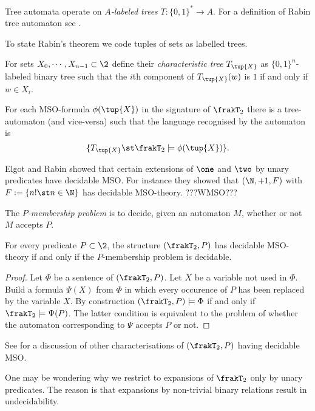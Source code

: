 Tree automata operate on {\em $A$-labeled trees} $T:\{0,1\}^\ast \to A$. 
For a definition of Rabin tree automaton see \cite{}.

To state Rabin's theorem we code tuples of sets as labelled trees.

\begin{definition}
For sets $X_0, \cdots,  X_{n-1} \subset \2$ define their {\em characteristic
tree} $T_{\tup{X}}$ as $\{0,1\}^n$-labeled binary tree such that the $i$th
component of $T_{\tup{X}}(w)$ is $1$ if and only if $w \in X_i$.
\end{definition}

\begin{theorem}
For each MSO-formula $\phi(\tup{X})$ in the signature of $\frakT_2$ there is a tree-automaton (and vice-versa) such that the language recognised by the automaton is
\[
\{T_{\tup{X}} \st \frakT_2 \models \phi(\tup{X})\}.
\]
\end{theorem}

Elgot and Rabin showed that certain extensions of $\one$ and $\two$ by unary
predicates have decidable MSO.  For instance they showed that $(\N,+1,F)$
with $F := \{n! \st n \in \N\}$ has decidable MSO-theory. ???WMSO???
 
The {\em $P$-membership problem} is to decide, given an automaton $M$,
whether or not $M$ accepts $P$.

\begin{lemma}
For every predicate $P \subset \2$, the structure $(\frakT_2,P)$ has decidable
MSO-theory if and only if the $P$-membership problem is decidable.
\end{lemma}

\begin{proof}
Let $\Phi$ be a sentence of $(\frakT_2,P)$. Let $X$ be a
variable not used in $\Phi$.  Build a formula $\Psi(X)$ from $\Phi$ in which
every occurence of $P$ has been replaced by the variable $X$.  By construction
$(\frakT_2,P) \models \Phi$ if and only if $\frakT_2 \models \Psi(P)$.  The
latter condition is equivalent to the problem of whether the automaton
corresponding to $\Psi$ accepts $P$ or not.
\end{proof}

See \cite{} for a discussion of other characterisations of $(\frakT_2,P)$ having decidable MSO.

One may be wondering why we restrict to expansions of $\frakT_2$ only by unary predicates.
The reason is that expansions by non-trivial binary relations result in undecidability. 

